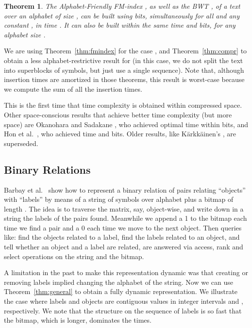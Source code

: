 \documentclass[11pt]{article}
\newtheorem{theorem}{Theorem}
\begin{document}
\begin{theorem}
The Alphabet-Friendly FM-index \cite{FMMN07}, as well as the BWT \cite{BW94}, 
of a text  over an alphabet of size , can be built using 
 bits, simultaneously for
all  and any constant , in time
. It can also be built within the same time and 
 bits, for
any alphabet size .
\end{theorem}

We are using Theorem~\ref{thm:fmindex} for the case , and 
Theorem~\ref{thm:compr} to obtain a less alphabet-restrictive result for
 (in this case, we do not split the text into superblocks of 
 symbols, but just use a single sequence). Note that,
although insertion times are amortized in those theorems, this result is
worst-case because we compute the sum of all the insertion times.

This is the first time that  time
complexity is obtained within compressed space. Other
space-conscious results that achieve better time complexity (but more space)
are Okanohara and Sadakane \cite{OS09}, who achieved optimal 
 time within  bits, and
Hon et al.\ \cite{HSS09}, who achieved  time and 
 bits. Older results, like K\"arkk\"ainen's \cite{Kar07}, 
are superseded.

\subsection{Binary Relations}

Barbay et al.\ \cite{BGMR07} show how to represent a binary relation of  pairs
relating  ``objects'' with  ``labels'' by means of a string of
 symbols over alphabet  plus a bitmap of length . The
idea is to traverse the matrix, say, object-wise,
and write down in a string the labels of the pairs found. Meanwhile we append
a 1 to the bitmap each time we find a pair and a 0 each time we move to the
next object. Then queries like: find the objects related to a label, find the
labels related to an object, and tell whether an object and a label are
related, are answered via access, rank and select operations on the string
and the bitmap.

A limitation in the past to make this representation dynamic was that creating
or removing labels implied changing the alphabet of the string. Now we can use
Theorem~\ref{thm:general} to obtain a fully dynamic representation. We 
illustrate the case where labels and objects are contiguous values in integer 
intervals  and , respectively. We note that the structure
on the sequence of labels is so fast that the bitmap, which is longer, dominates
the times.
\end{document}
